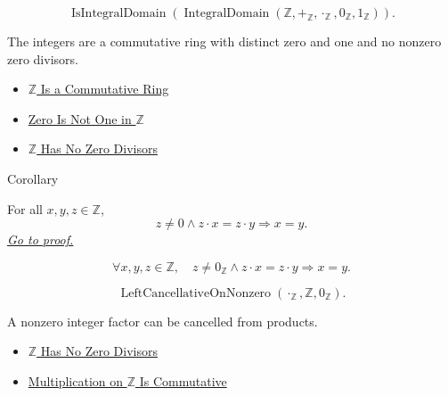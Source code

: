 \begin{remark*}
\[
\operatorname{IsIntegralDomain}(
\operatorname{IntegralDomain}(\mathbb{Z},+_{\mathbb{Z}},\cdot_{\mathbb{Z}},
0_{\mathbb{Z}},1_{\mathbb{Z}})).
\]
\end{remark*}

\begin{remark*}[Interpretation]
The integers are a commutative ring with distinct zero and one and no nonzero
zero divisors.
\end{remark*}

\begin{dependencies}
\begin{itemize}
  \item \hyperref[thm:z-commutative-ring]{$\mathbb{Z}$ Is a Commutative Ring}
  \item \hyperref[thm:zero-not-one-in-z]{Zero Is Not One in $\mathbb{Z}$}
  \item \hyperref[thm:z-has-no-zero-divisors]{$\mathbb{Z}$ Has No Zero Divisors}
\end{itemize}
\end{dependencies}

\begin{corollarybox}{Corollary}
\begin{corollary}
\label{cor:multiplicative-cancellation-on-z}
For all $x,y,z\in\mathbb{Z}$,
\[
z\ne 0 \land z\cdot x=z\cdot y \Longrightarrow x=y.
\]
\hyperref[prf:multiplicative-cancellation-on-z]{\textit{Go to proof.}}
\end{corollary}
\end{corollarybox}

\begin{remark*}
\[
\forall x,y,z\in\mathbb{Z},\quad
z\ne0_{\mathbb{Z}}\land z\cdot x=z\cdot y \Longrightarrow x=y.
\]
\end{remark*}

\begin{remark*}
\[
\operatorname{LeftCancellativeOnNonzero}(\cdot_{\mathbb{Z}},\mathbb{Z},0_{\mathbb{Z}}).
\]
\end{remark*}

\begin{remark*}[Interpretation]
A nonzero integer factor can be cancelled from products.
\end{remark*}

\begin{dependencies}
\begin{itemize}
  \item \hyperref[thm:z-has-no-zero-divisors]{$\mathbb{Z}$ Has No Zero Divisors}
  \item \hyperref[thm:multiplication-on-z-commutative]{Multiplication on $\mathbb{Z}$ Is Commutative}
\end{itemize}
\end{dependencies}

